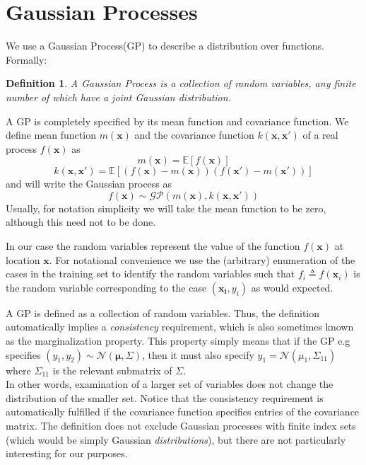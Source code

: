 \documentclass[twoside]{article}
\newtheorem{definition}[theorem]{Definition}
\begin{document}
\section{Gaussian Processes}
We use a Gaussian Process(GP) to describe a distribution over functions. Formally:
\begin{definition}
A Gaussian Process is a collection of random variables, any finite number of which have a joint Gaussian distribution.
\end{definition}
A GP is completely specified by its mean function and covariance function. We define mean function $m(\boldsymbol{x})$ and the covariance function $k(\boldsymbol{x}, \boldsymbol{x'})$ of a real process $f(\boldsymbol{x})$ as
\begin{equation*}
    m(\boldsymbol{x}) = \mathbb{E}[f(\boldsymbol{x})]
\end{equation*}
\begin{equation*}
    k(\boldsymbol{x}, \boldsymbol{x'}) = \mathbb{E}[(f(\boldsymbol{x}) - m(\boldsymbol{x}))(f(\boldsymbol{x'}) - m(\boldsymbol{x'}))]
\end{equation*}
and will write the Gaussian process as
\begin{equation*}
    f(\boldsymbol{x}) \sim \mathcal{GP}(m(\boldsymbol{x}), k(\boldsymbol{x}, \boldsymbol{x'}))
\end{equation*}
Usually, for notation simplicity we will take the mean function to be zero, although this need not to be done.\medskip

In our case the random variables represent the value of the function $f(\boldsymbol{x})$ at location $\boldsymbol{x}$. For notational convenience we use the (arbitrary) enumeration of the cases in the training set to identify the random variables such that $f_i \triangleq  f(\boldsymbol{x}_i)$ is the random variable corresponding to the case $(\boldsymbol{x_i}, y_i)$ as would expected.\medskip

A GP is defined as a collection of random variables. Thus, the definition automatically implies a \textit{consistency} requirement, which is also sometimes known as the marginalization property. This property simply means that if the GP e.g specifies $(y_1, y_2) \sim \mathcal{N}(\boldsymbol{\mu}, \Sigma)$, then it must also specify $y_1 = \mathcal{N}(\mu_1, \Sigma_{11})$ where $ \Sigma_{11}$ is the relevant submatrix of $\Sigma$.\\
In other words, examination of a larger set of variables does not change the distribution of the smaller set. Notice that the consistency requirement is automatically fulfilled if the covariance function specifies entries of the covariance matrix. The definition does not exclude Gaussian processes with finite index sets (which would be simply Gaussian \textit{distributions}), but there are not particularly interesting for our purposes.\medskip
\end{document}

